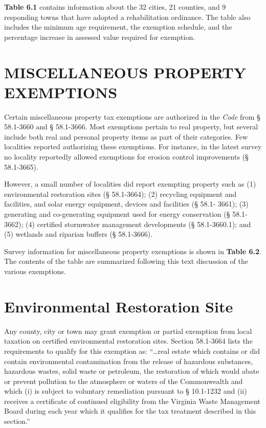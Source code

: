 \documentclass[
]{book}
\begin{document}
\textbf{Table 6.1} contains information about the 32 cities, 21 counties, and 9 responding towns that have adopted a rehabilitation ordinance. The table also includes the minimum age requirement, the exemption schedule, and the percentage increase in assessed value required for exemption.

\hypertarget{miscellaneous-property-exemptions}{%
\section{MISCELLANEOUS PROPERTY EXEMPTIONS}\label{miscellaneous-property-exemptions}}

Certain miscellaneous property tax exemptions are authorized in the \emph{Code} from § 58.1-3660 and § 58.1-3666. Most exemptions pertain to real property, but several include both real and personal property items as part of their categories. Few localities reported authorizing these exemptions. For instance, in the latest survey no locality reportedly allowed exemptions for erosion control improvements (§ 58.1-3665).

However, a small number of localities did report exempting property such as (1) environmental restoration sites (§ 58.1-3664); (2) recycling equipment and facilities, and solar energy equipment, devices and facilities (§ 58.1- 3661); (3) generating and co-generating equipment used for energy conservation (§ 58.1-3662); (4) certified stormwater management developments (§ 58.1-3660.1); and (5) wetlands and riparian buffers (§ 58.1-3666).

Survey information for miscellaneous property exemptions is shown in \textbf{Table 6.2}. The contents of the table are summarized following this text discussion of the various exemptions.

\hypertarget{environmental-restoration-site}{%
\section{Environmental Restoration Site}\label{environmental-restoration-site}}

Any county, city or town may grant exemption or partial exemption from local taxation on certified environmental restoration sites. Section 58.1-3664 lists the requirements to qualify for this exemption as: ``\ldots real estate which contains or did contain environmental contamination from the release of hazardous substances, hazardous wastes, solid waste or petroleum, the restoration of which would abate or prevent pollution to the atmosphere or waters of the Commonwealth and which (i) is subject to voluntary remediation pursuant to § 10.1-1232 and (ii) receives a certificate of continued eligibility from the Virginia Waste Management Board during each year which it qualifies for the tax treatment described in this section.''
\end{document}
